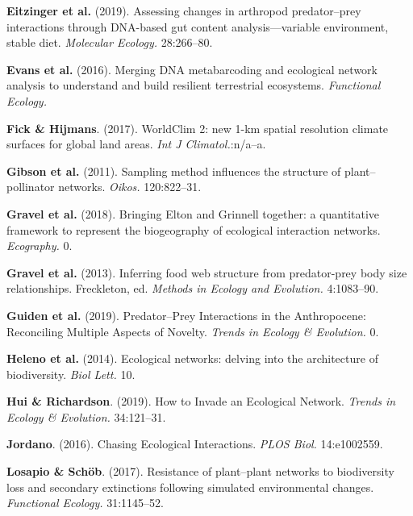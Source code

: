 \leavevmode\hypertarget{ref-EitzAbre19}{}%
\textbf{Eitzinger et al.} (2019). Assessing changes in arthropod
predator--prey interactions through DNA-based gut content
analysis---variable environment, stable diet. \emph{Molecular Ecology.}
28:266--80.

\leavevmode\hypertarget{ref-EvanKits16}{}%
\textbf{Evans et al.} (2016). Merging DNA metabarcoding and ecological
network analysis to understand and build resilient terrestrial
ecosystems. \emph{Functional Ecology.}

\leavevmode\hypertarget{ref-FickHijm17}{}%
\textbf{Fick \& Hijmans}. (2017). WorldClim 2: new 1-km spatial
resolution climate surfaces for global land areas. \emph{Int J
Climatol.}:n/a--a.

\leavevmode\hypertarget{ref-GibsKnot11}{}%
\textbf{Gibson et al.} (2011). Sampling method influences the structure
of plant--pollinator networks. \emph{Oikos.} 120:822--31.

\leavevmode\hypertarget{ref-GravBais18}{}%
\textbf{Gravel et al.} (2018). Bringing Elton and Grinnell together: a
quantitative framework to represent the biogeography of ecological
interaction networks. \emph{Ecography.} 0.

\leavevmode\hypertarget{ref-GravPois13}{}%
\textbf{Gravel et al.} (2013). Inferring food web structure from
predator-prey body size relationships. Freckleton, ed. \emph{Methods in
Ecology and Evolution.} 4:1083--90.

\leavevmode\hypertarget{ref-GuidBart19}{}%
\textbf{Guiden et al.} (2019). Predator--Prey Interactions in the
Anthropocene: Reconciling Multiple Aspects of Novelty. \emph{Trends in
Ecology \& Evolution.} 0.

\leavevmode\hypertarget{ref-HeleGarc14}{}%
\textbf{Heleno et al.} (2014). Ecological networks: delving into the
architecture of biodiversity. \emph{Biol Lett.} 10.

\leavevmode\hypertarget{ref-HuiRich19}{}%
\textbf{Hui \& Richardson}. (2019). How to Invade an Ecological Network.
\emph{Trends in Ecology \& Evolution.} 34:121--31.

\leavevmode\hypertarget{ref-Jord16}{}%
\textbf{Jordano}. (2016). Chasing Ecological Interactions. \emph{PLOS
Biol.} 14:e1002559.

\leavevmode\hypertarget{ref-LosaScho17}{}%
\textbf{Losapio \& Schöb}. (2017). Resistance of plant--plant networks
to biodiversity loss and secondary extinctions following simulated
environmental changes. \emph{Functional Ecology.} 31:1145--52.

